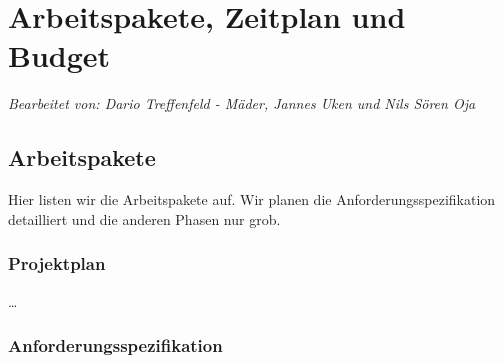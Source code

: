 \section{Arbeitspakete, Zeitplan und Budget}

\textit{Bearbeitet von: Dario Treffenfeld - Mäder, Jannes Uken und Nils Sören Oja}\\

\subsection{Arbeitspakete}\label{aps}

Hier listen wir die Arbeitspakete auf. Wir planen die Anforderungsspezifikation detailliert und die anderen Phasen nur grob. 

\subsubsection{Projektplan}
\ldots
\subsubsection{Anforderungsspezifikation}


